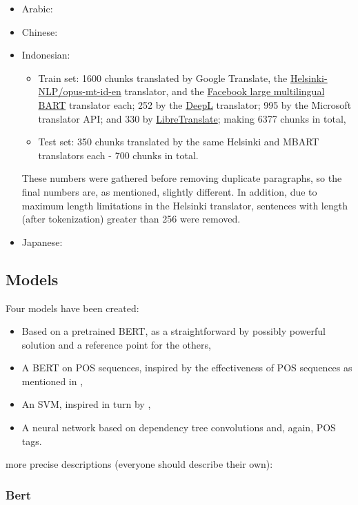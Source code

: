 \documentclass[twocolumn]{article}
\begin{document}
\begin{itemize}
	\item Arabic:
	\item Chinese:
	\item Indonesian:
	\begin{itemize}
		\item Train set: 1600 chunks translated by Google Translate, the \href{https://huggingface.co/Helsinki-NLP/opus-mt-id-en}{Helsinki-NLP/opus-mt-id-en} translator, and the \href{https://huggingface.co/facebook/mbart-large-50-many-to-one-mmt}{Facebook large multilingual BART} translator each; 252 by the \href{https://www.deepl.com/en/translator}{DeepL} translator; 995  by the Microsoft translator API; and 330 by \href{https://libretranslate.com/}{LibreTranslate}; making 6377 chunks in total,
		\item Test set: 350 chunks translated by the same Helsinki and MBART translators each - 700 chunks in total.
	\end{itemize}
	These numbers were gathered before removing duplicate paragraphs, so the final numbers are, as mentioned, slightly different. In addition, due to maximum length limitations in the Helsinki translator, sentences with length (after tokenization) greater than 256 were removed.

	\item Japanese:
\end{itemize}

\subsection*{Models}

Four models have been created:

\begin{itemize}
	\item Based on a pretrained BERT, as a straightforward by possibly powerful solution and a reference point for the others,
	\item A BERT on POS sequences, inspired by the effectiveness of POS sequences as mentioned in \cite{canada},
	\item An SVM, inspired in turn by \cite{literary},
	\item A neural network based on dependency tree convolutions and, again, POS tags.
\end{itemize}

more precise descriptions (everyone should describe their own):

\subsubsection*{Bert}
\end{document}
